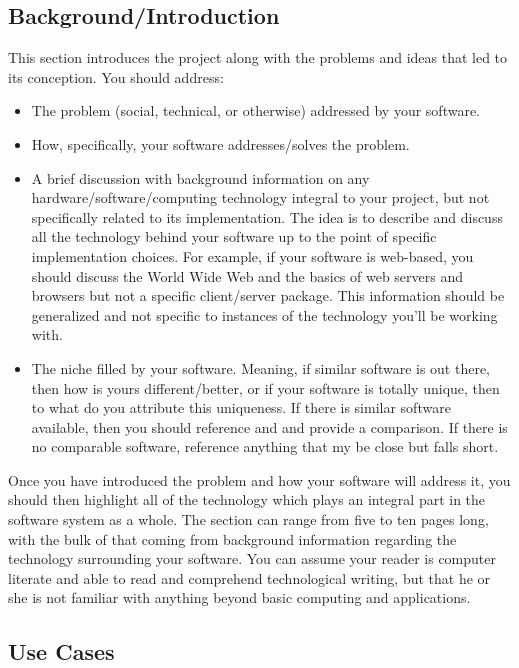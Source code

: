 \documentclass[10pt]{article}
\begin{document}
\subsection{Background/Introduction}
This section introduces the project along with the problems and ideas that led to its conception.  You should address:
\begin{itemize}
\item The problem (social, technical, or otherwise) addressed by your software.
\item How, specifically, your software addresses/solves the problem.
\item A brief discussion with background information on any hardware/software/computing technology integral to your project, but not specifically related to its implementation. The idea is to describe and discuss all the technology behind your software up to the point of specific implementation choices.  For example, if your software is web-based, you should discuss the World Wide Web and the basics of web servers and browsers but not a specific client/server package.  This information should be generalized and not specific to instances of the technology you'll be working with.  
\item The niche filled by your software. Meaning, if similar software is out there, then how is yours different/better, or if your software is totally unique, then to what do you attribute this uniqueness.  If there is similar software available, then you should reference and and provide a comparison.  If there is no comparable software, reference anything that my be close but falls short.
\end{itemize}
Once you have introduced the problem and how your software will address it, you should then highlight all of the technology which plays an integral part in the software system as a whole.  The section can range from five to ten pages long, with the bulk of that coming from background information regarding the technology surrounding your software.  You can assume your reader is computer literate and able to read and comprehend technological writing, but that he or she is not familiar with anything beyond basic computing and applications.  

\subsection{Use Cases}
\end{document}
